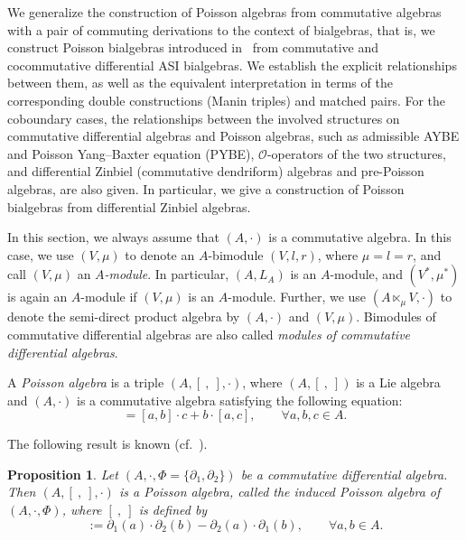 \documentclass[10pt,a4paper]{amsart}
\numberwithin{equation}{section}
\newtheorem{Proposition}[Theorem]{Proposition}
{ \theoremstyle{definition}
	\newtheorem{Definition}[Theorem]{Definition}
	\newtheorem{Note}[Theorem]{Note}
	\newtheorem{Example}[Theorem]{Example}
	\newtheorem{Remark}[Theorem]{Remark} }
\begin{document}
We generalize the construction of Poisson algebras from commutative algebras with a pair of commuting derivations to the context of bialgebras,
that is, we construct Poisson bialgebras introduced in~\cite{ni2013poisson} from commutative and cocommutative differential ASI bialgebras.
We establish the explicit relationships between them, as well as the equivalent interpretation in terms of the corresponding double constructions (Manin triples) and matched pairs.
For the coboundary cases, the relationships between the involved structures on commutative differential algebras and Poisson algebras,
such as admissible AYBE and Poisson Yang--Baxter equation (PYBE), $\mathcal{O}$-operators of the two structures, and differential Zinbiel (commutative dendriform) algebras and pre-Poisson algebras, are also given.
In particular, we give a construction of Poisson bialgebras from differential Zinbiel algebras.


In this section, we always assume that $(A, \cdot)$ is a commutative algebra.
In this case, we use $(V, \mu)$ to denote an $A$-bimodule $(V,l,r)$,
where $\mu = l = r$, and call $(V, \mu)$ an \textit{$A$-module}.
In particular, $(A, L_A)$ is an $A$-module, and $(V^*, \mu^*)$ is again an $A$-module if $(V, \mu)$ is an $A$-module.
Further, we use $(A \ltimes_\mu V, \cdot)$ to denote the semi-direct product algebra by $(A, \cdot)$ and $(V, \mu)$.
Bimodules of commutative differential algebras are also called \textit{modules of commutative differential algebras}.


\begin{Definition}
 A \textit{Poisson algebra} is a triple $(A, [\ ,\ ], \cdot)$, where $(A, [\ ,\ ])$ is a Lie algebra and $(A, \cdot)$ is a commutative algebra satisfying the following equation:
 \begin{equation*}
 [a, b \cdot c] = [a, b] \cdot c + b \cdot [a, c], \qquad
 \forall a, b, c \in A.
 \end{equation*}
\end{Definition}

The following result is known (cf.~\cite{BV1}).

\begin{Proposition}
 Let $(A, \cdot, \Phi = \{\partial_1, \partial_2\})$ be a commutative differential algebra.
 Then $(A, [\ ,\ ], \cdot)$ is a Poisson algebra,
 called the \textit{induced Poisson algebra of $(A, \cdot, \Phi)$},
 where $[\ ,\ ]$ is defined by
 \begin{equation}
 [a, b] := \partial_1(a) \cdot \partial_2(b) - \partial_2(a) \cdot \partial_1(b), \qquad
 \forall a, b \in A. \label{eq:lie}
 \end{equation}
\end{Proposition}
\end{document}
